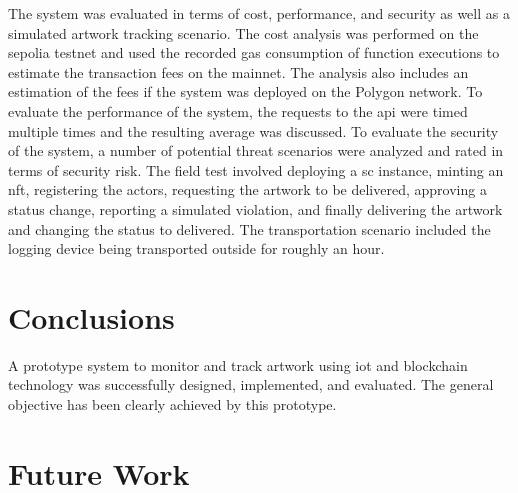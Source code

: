The system was evaluated in terms of cost, performance, and security as well as a simulated artwork tracking scenario. The cost analysis was performed on the sepolia testnet and used the recorded gas consumption of function executions to estimate the transaction fees on the mainnet. The analysis also includes an estimation of the fees if the system was deployed on the Polygon network. To evaluate the performance of the system, the requests to the \gls{api} were timed multiple times and the resulting average was discussed. To evaluate the security of the system, a number of potential threat scenarios were analyzed and rated in terms of security risk.  The field test involved deploying a \gls{sc} instance, minting an \gls{nft}, registering the actors, requesting the artwork to be delivered, approving a status change, reporting a simulated violation, and finally delivering the artwork and changing the status to delivered. The transportation scenario included the logging device being transported outside for roughly an hour. 

\section{Conclusions}
A prototype system to monitor and track artwork using \gls{iot} and blockchain technology was successfully designed, implemented, and evaluated. The general objective has been clearly achieved by this prototype. 


\section{Future Work}